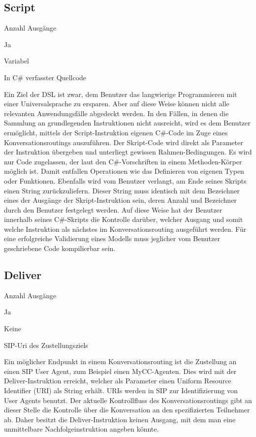 \subsection{Script}
\label{subsec:Script}
\begin{labeling}{Anzahl Ausgänge}
\item [Eingang] Ja
\item [Anzahl Ausgänge] Variabel
\item [Parameter] In C\# verfasster Quellcode
\item [Beschreibung] Ein Ziel der DSL ist zwar, dem Benutzer das langwierige Programmieren mit einer Universalsprache zu ersparen. Aber auf diese Weise können nicht alle relevanten Anwendungsfälle abgedeckt werden. In den Fällen, in denen die Sammlung an grundlegenden Instruktionen nicht ausreicht, wird es dem Benutzer ermöglicht, mittels der Script-Instruktion eigenen C\#-Code im Zuge eines Konversationsroutings auszuführen. Der Skript-Code wird direkt als Parameter der Instruktion übergeben und unterliegt gewissen Rahmen-Bedingungen. Es wird nur Code zugelassen, der laut den C\#-Vorschriften in einem Methoden-Körper möglich ist. Damit entfallen Operationen wie das Definieren von eigenen Typen oder Funktionen. Ebenfalls wird vom Benutzer verlangt, am Ende seines Skripts einen String zurückzuliefern. Dieser String muss identisch mit dem Bezeichner eines der Ausgänge der Skript-Instruktion sein, deren Anzahl und Bezeichner durch den Benutzer festgelegt werden. Auf diese Weise hat der Benutzer innerhalb seines C\#-Skripts die Kontrolle darüber, welcher Ausgang und somit welche Instruktion als nächstes im Konversationsrouting ausgeführt werden. Für eine erfolgreiche Validierung eines Modells muss jeglicher vom Benutzer geschriebene Code kompilierbar sein.   
\end{labeling}

\subsection{Deliver}
\label{subsec:Deliver}
\begin{labeling}{Anzahl Ausgänge}
\item [Eingang] Ja
\item [Anzahl Ausgänge] Keine
\item [Parameter] SIP-Uri des Zustellungsziels
\item [Beschreibung] Ein möglicher Endpunkt in einem Konversationsrouting ist die Zustellung an einen SIP User Agent, zum Beispiel einen MyCC-Agenten. Dies wird mit der Deliver-Instruktion erreicht, welcher als Parameter einen Uniform Resource Identifier (URI) als String erhält. URIs werden in SIP zur Identifizierung von User Agents benutzt. Der aktuelle Kontrollfluss des Konversationsroutings gibt an dieser Stelle die Kontrolle über die Konversation an den spezifizierten Teilnehmer ab. Daher besitzt die Deliver-Instruktion keinen Ausgang, mit dem man eine unmittelbare Nachfolgeinstruktion angeben könnte.
\end{labeling}

